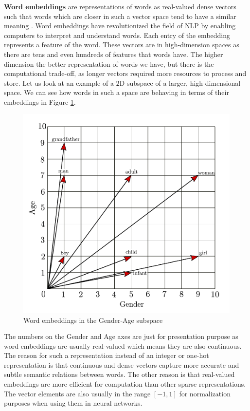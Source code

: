 \documentclass[12pt]{article}
\numberwithin{equation}{section}
\begin{document}
\begin{spacing}{1.5}
	\textbf{Word embeddings} are representations of words as real-valued dense vectors such that words which are closer in such a vector space tend to have a similar meaning \cite{word-embedding-survey}. Word embeddings have revolutionized the field of NLP by enabling computers to interpret and understand words. Each entry of the embedding represents a feature of the word. These vectors are in high-dimension spaces as there are tens and even hundreds of features that words have. The higher dimension the better representation of words we have, but there is the computational trade-off, as longer vectors required more resources to process and store. Let us look at an example of a $2$D subspace of a larger, high-dimensional space. We can see how words in such a space are behaving in terms of their embeddings in Figure \ref{subspace_label}.
	\begin{figure}[H]
		\centering
		\hspace*{-1.0cm}
		\includegraphics[scale=0.75]{subspace}		
		\caption{Word embeddings in the Gender-Age subspace}
		\label{subspace_label}
	\end{figure}
	
	The numbers on the Gender and Age axes are just for presentation purpose as word embeddings are usually real-valued which means they are also continuous. The reason for such a representation instead of an integer or one-hot representation is that continuous and dense vectors capture more accurate and subtle semantic relations between words. The other reason is that real-valued embeddings are more efficient for computation than other sparse representations. The vector elements are also usually in the range $[-1, 1]$ for normalization purposes when using them in neural networks. 
	

\end{spacing}
\end{document}
